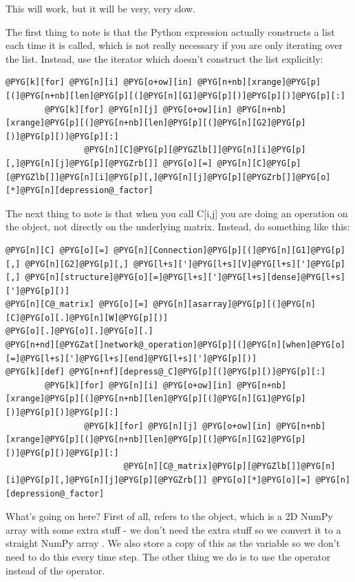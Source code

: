 \documentclass[letterpaper,10pt,english]{manual}
\begin{document}
This will work, but it will be very, very slow.

The first thing to note is that the Python expression 
actually constructs a list \code{{[}0,1,2,...,N-1{]}} each time it is called,
which is not really necessary if you are only iterating over the list.
Instead, use the  iterator which doesn't construct the list
explicitly:

\begin{Verbatim}[commandchars=@\[\]]
@PYG[k][for] @PYG[n][i] @PYG[o+ow][in] @PYG[n+nb][xrange]@PYG[p][(]@PYG[n+nb][len]@PYG[p][(]@PYG[n][G1]@PYG[p][)]@PYG[p][)]@PYG[p][:]
        @PYG[k][for] @PYG[n][j] @PYG[o+ow][in] @PYG[n+nb][xrange]@PYG[p][(]@PYG[n+nb][len]@PYG[p][(]@PYG[n][G2]@PYG[p][)]@PYG[p][)]@PYG[p][:]
                @PYG[n][C]@PYG[p][@PYGZlb[]]@PYG[n][i]@PYG[p][,]@PYG[n][j]@PYG[p][@PYGZrb[]] @PYG[o][=] @PYG[n][C]@PYG[p][@PYGZlb[]]@PYG[n][i]@PYG[p][,]@PYG[n][j]@PYG[p][@PYGZrb[]]@PYG[o][*]@PYG[n][depression@_factor]
\end{Verbatim}

The next thing to note is that when you call C{[}i,j{]} you are doing an
operation on the \hyperlink{brian.Connection}{} object, not directly on the underlying
matrix. Instead, do something like this:

\begin{Verbatim}[commandchars=@\[\]]
@PYG[n][C] @PYG[o][=] @PYG[n][Connection]@PYG[p][(]@PYG[n][G1]@PYG[p][,] @PYG[n][G2]@PYG[p][,] @PYG[l+s][']@PYG[l+s][V]@PYG[l+s][']@PYG[p][,] @PYG[n][structure]@PYG[o][=]@PYG[l+s][']@PYG[l+s][dense]@PYG[l+s][']@PYG[p][)]
@PYG[n][C@_matrix] @PYG[o][=] @PYG[n][asarray]@PYG[p][(]@PYG[n][C]@PYG[o][.]@PYG[n][W]@PYG[p][)]
@PYG[o][.]@PYG[o][.]@PYG[o][.]
@PYG[n+nd][@PYGZat[]network@_operation]@PYG[p][(]@PYG[n][when]@PYG[o][=]@PYG[l+s][']@PYG[l+s][end]@PYG[l+s][']@PYG[p][)]
@PYG[k][def] @PYG[n+nf][depress@_C]@PYG[p][(]@PYG[p][)]@PYG[p][:]
        @PYG[k][for] @PYG[n][i] @PYG[o+ow][in] @PYG[n+nb][xrange]@PYG[p][(]@PYG[n+nb][len]@PYG[p][(]@PYG[n][G1]@PYG[p][)]@PYG[p][)]@PYG[p][:]
                @PYG[k][for] @PYG[n][j] @PYG[o+ow][in] @PYG[n+nb][xrange]@PYG[p][(]@PYG[n+nb][len]@PYG[p][(]@PYG[n][G2]@PYG[p][)]@PYG[p][)]@PYG[p][:]
                        @PYG[n][C@_matrix]@PYG[p][@PYGZlb[]]@PYG[n][i]@PYG[p][,]@PYG[n][j]@PYG[p][@PYGZrb[]] @PYG[o][*]@PYG[o][=] @PYG[n][depression@_factor]
\end{Verbatim}

What's going on here? First of all,  refers to the \hyperlink{brian.ConnectionMatrix}{}
object, which is a 2D NumPy array with some extra stuff - we don't need the extra
stuff so we convert it to a straight NumPy array . We also store
a copy of this as the variable  so we don't need to do this every
time step. The other thing we do is to use the \code{*=} operator instead of the \code{*}
operator.
\end{document}
